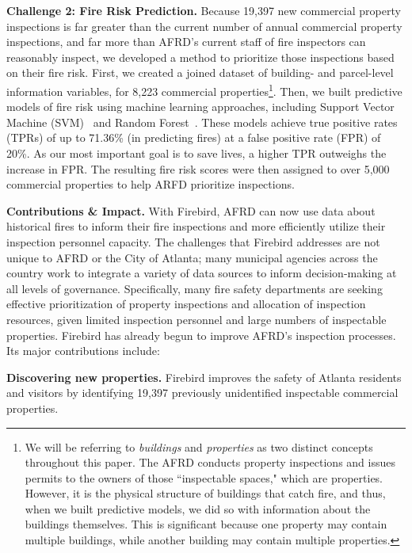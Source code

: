 \documentclass{sig-alternate-05-2015}
\begin{document}
{\textbf{Challenge 2: Fire Risk Prediction.} Because 19,397 new commercial property inspections is far greater than the current number of annual commercial property inspections, and far more than AFRD's current staff of fire inspectors can reasonably inspect, we developed a method to prioritize those inspections based on their fire risk. 
First, we created a joined dataset of building- and parcel-level information variables, for 8,223 commercial properties\footnote{We will be referring to \emph{buildings} and \emph{properties} as two distinct concepts throughout this paper. The AFRD conducts property inspections and issues permits to the owners of those ``inspectable spaces," which are properties. However, it is the physical structure of buildings that catch fire, and thus, when we built  predictive models, we did so with information about the buildings themselves. This is significant because one property may contain multiple buildings, while another building may contain multiple properties.}.
Then, we built predictive models of fire risk using machine learning approaches, including Support Vector Machine (SVM)~\cite{cortes1995support} and Random Forest~\cite{breiman2001random}.
These models achieve true positive rates (TPRs) of up to 71.36\% (in predicting fires) at a false positive rate (FPR) of 20\%.
As our most important goal is to save lives, a higher TPR outweighs the increase in FPR.
The resulting fire risk scores were then assigned to over 5,000 commercial properties to help ARFD prioritize inspections.

\textbf{Contributions \& Impact.} With Firebird, AFRD can now use data about historical fires to inform their fire inspections and more efficiently utilize their inspection personnel capacity. 
The challenges that Firebird addresses are not unique to AFRD or the City of Atlanta; 
many municipal agencies across the country work to integrate a variety of data sources to inform decision-making at all levels of governance. 
Specifically, many fire safety departments are seeking effective prioritization of property inspections and allocation of inspection resources, given limited inspection personnel and large numbers of inspectable properties.
Firebird has already begun to improve AFRD's inspection processes. Its major contributions include:
\begin{itemize*}  \itemsep1pt \parskip0pt 

\item \textbf{Discovering new properties.} 
Firebird improves the safety of Atlanta residents and visitors by identifying 19,397 previously unidentified inspectable commercial properties.


\end{itemize*}}
\end{document}
